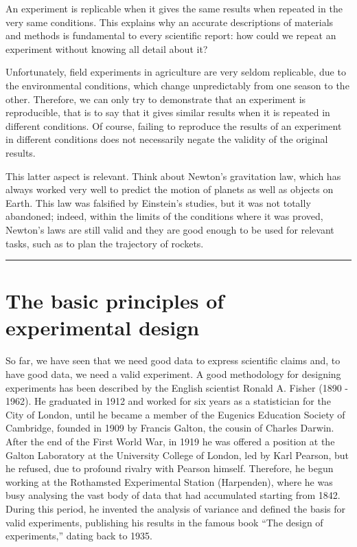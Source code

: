 \documentclass[a4paper,12pt,oneside]{book}
\begin{document}
An experiment is replicable when it gives the same results when repeated in the very same conditions. This explains why an accurate descriptions of materials and methods is fundamental to every scientific report: how could we repeat an experiment without knowing all detail about it?

Unfortunately, field experiments in agriculture are very seldom replicable, due to the environmental conditions, which change unpredictably from one season to the other. Therefore, we can only try to demonstrate that an experiment is reproducible, that is to say that it gives similar results when it is repeated in different conditions. Of course, failing to reproduce the results of an experiment in different conditions does not necessarily negate the validity of the original results.

This latter aspect is relevant. Think about Newton's gravitation law, which has always worked very well to predict the motion of planets as well as objects on Earth. This law was falsified by Einstein's studies, but it was not totally abandoned; indeed, within the limits of the conditions where it was proved, Newton's laws are still valid and they are good enough to be used for relevant tasks, such as to plan the trajectory of rockets.

\begin{center}\rule{0.5\linewidth}{0.5pt}\end{center}

\hypertarget{the-basic-principles-of-experimental-design}{%
\section{The basic principles of experimental design}\label{the-basic-principles-of-experimental-design}}

So far, we have seen that we need good data to express scientific claims and, to have good data, we need a valid experiment. A good methodology for designing experiments has been described by the English scientist Ronald A. Fisher (1890 - 1962). He graduated in 1912 and worked for six years as a statistician for the City of London, until he became a member of the Eugenics Education Society of Cambridge, founded in 1909 by Francis Galton, the cousin of Charles Darwin. After the end of the First World War, in 1919 he was offered a position at the Galton Laboratory at the University College of London, led by Karl Pearson, but he refused, due to profound rivalry with Pearson himself. Therefore, he begun working at the Rothamsted Experimental Station (Harpenden), where he was busy analysing the vast body of data that had accumulated starting from 1842. During this period, he invented the analysis of variance and defined the basis for valid experiments, publishing his results in the famous book ``The design of experiments,'' dating back to 1935.
\end{document}
